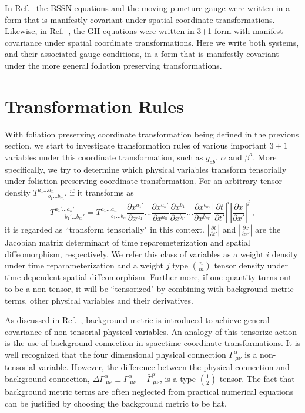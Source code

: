 In Ref.~\cite{Brown:2009dd} the BSSN equations and the moving puncture gauge were written in a form that is manifestly covariant under spatial coordinate transformations. 
Likewise, in Ref.~\cite{Brown:2011qg}, the GH equations were written in 3+1 form with manifest covariance 
under spatial coordinate transformations.  Here we write both systems, and their associated gauge conditions, in a form 
that is manifestly covariant under the more general foliation preserving transformations. 

\section{Transformation Rules}\label{transform}
With foliation preserving coordinate transformation being defined in the previous section, we start to investigate transformation rules of various important $3 + 1$ variables under this coordinate transformation, such as $g_{ab}$, $\alpha$ and $\beta^{a}$. More specifically, we try to determine which physical variables transform tensorially under foliation preserving coordinate transformation. For an arbitrary tensor density $T^{a_{1}...a_{n}}_{~~~~~~~~b_{1}...b_{m}}$, if it transforms as
\begin{equation}
	T^{a_{1}'...a_{n}'}_{~~~~~~~~b_{1}'...b_{m}'} = T^{a_{1}...a_{n}}_{~~~~~~~~b_{1}...b_{n}}\frac{\partial x^{a_{1}'}}{\partial x^{a_{1}}}...\frac{\partial x^{a_{n}'}}{\partial x^{a_{n}}}\frac{\partial x^{b_{1}}}{\partial x^{b_{1'}}}...\frac{\partial x^{b_{m}}}{\partial x^{b_{m'}}}\left|\frac{\partial t}{\partial t'}\right|^{i}\left|\frac{\partial x}{\partial x'}\right|^{j} \ ,
\end{equation}
it is regarded as ``transform tensorially" in this context. $\left|\frac{\partial t}{\partial t'}\right|$ and $\left|\frac{\partial x}{\partial x'}\right|$ are the Jacobian matrix determinant of time reparemeterization and spatial diffeomorphism, respectively. We refer this class of variables as a weight $i$ density under time reparameterization and a weight $j$ type $n \choose m$ tensor density under time dependent spatial diffeomorphism. Further more, if one quantity turns out to be a non-tensor, it will be ``tensorized" by combining with background metric terms, other physical variables and their derivatives. 

As discussed in Ref.~\cite{Brown:2010rya, Brown:2011qg}, background metric is introduced to achieve general covariance of non-tensorial physical variables. An analogy of this tensorize action is the use of background connection in spacetime coordinate transformations. It is well recognized that the four dimensional physical connection $\Gamma^{\alpha}_{~\mu\nu}$ is a non-tensorial variable. However, the difference between the physical connection and background connection, $\Delta \Gamma^{\alpha}_{~\mu\nu} \equiv \Gamma^{\alpha}_{~\mu\nu} - {\bar \Gamma}^{\alpha}_{~\mu\nu}$, is a type $1 \choose 2$ tensor. The fact that background metric terms are often neglected from practical numerical equations can be justified by choosing the background metric to be flat. 

